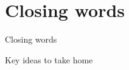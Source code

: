 \section{Closing words}

\begin{frame}{Closing words}
  \begin{block}{Key ideas to take home}
  \end{block}
\end{frame}
